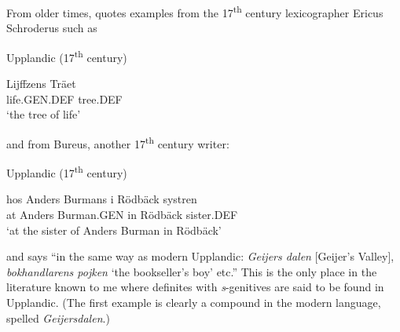 
From older times, \citet[523]{Hesselman1908} quotes examples from the 17\textsuperscript{th} century lexicographer Ericus Schroderus such as


\item 

Upplandic (17\textsuperscript{th} century)



 \ea\label{}
\gll Lijffzens  Träet\\


life.GEN.DEF  tree.DEF\\

\glt  ‘the tree of life’

\z

and from Bureus, another 17\textsuperscript{th} century writer:


\item 

Upplandic (17\textsuperscript{th} century)



 \ea\label{}
\gll hos  Anders  Burmans  i  Rödbäck  systren\\


at  Anders  Burman.GEN  in  Rödbäck  sister.DEF\\

\glt ‘at the sister of Anders Burman in Rödbäck’

\z

and says “in the same way as modern Upplandic: \textit{Geijers dalen }[Geijer’s Valley], \textit{bokhandlarens pojken} ‘the bookseller’s boy’ etc.” This is the only place in the literature known to me where definites with \textit{s}{}-genitives are said to be found in Upplandic. (The first example is clearly a compound in the modern language, spelled \textit{Geijersdalen}.)

